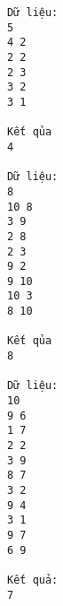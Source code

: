 \begin{verbatim}
Dữ liệu:
5
4 2
2 2
2 3
3 2
3 1

Kết qủa
4

Dữ liệu:
8
10 8
3 9
2 8
2 3
9 2
9 10
10 3
8 10

Kết qủa
8

Dữ liệu:
10
9 6
1 7
2 2
3 9
8 7
3 2
9 4
3 1
9 7
6 9

Kết quả:
7
\end{verbatim}